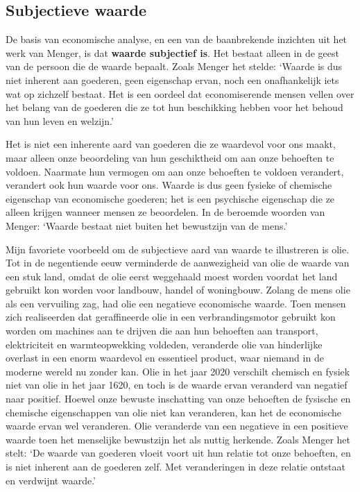 \subsection{Subjectieve waarde}

De basis van economische analyse, en een van de baanbrekende inzichten uit het werk van Menger, is dat \textbf{waarde subjectief is}. Het bestaat alleen in de geest van de persoon die de waarde bepaalt. Zoals Menger het stelde: `Waarde is dus niet inherent aan goederen, geen eigenschap ervan, noch een onafhankelijk iets wat op zichzelf bestaat. Het is een oordeel dat economiserende mensen vellen over het belang van de goederen die ze tot hun beschikking hebben voor het behoud van hun leven en welzijn.'\autocite{17}

Het is niet een inherente aard van goederen die ze waardevol voor ons maakt, maar alleen onze beoordeling van hun geschiktheid om aan onze behoeften te voldoen. Naarmate hun vermogen om aan onze behoeften te voldoen verandert, verandert ook hun waarde voor ons. Waarde is dus geen fysieke of chemische eigenschap van economische goederen; het is een psychische eigenschap die ze alleen krijgen wanneer mensen ze beoordelen. In de beroemde woorden van Menger: `Waarde bestaat niet buiten het bewustzijn van de mens.'\autocite{18}

Mijn favoriete voorbeeld om de subjectieve aard van waarde te illustreren is olie. Tot in de negentiende eeuw verminderde de aanwezigheid van olie de waarde van een stuk land, omdat de olie eerst weggehaald moest worden voordat het land gebruikt kon worden voor landbouw, handel of woningbouw. Zolang de mens olie als een vervuiling zag, had olie een negatieve economische waarde. Toen mensen zich realiseerden dat geraffineerde olie in een verbrandingsmotor gebruikt kon worden om machines aan te drijven die aan hun behoeften aan transport, elektriciteit en warmteopwekking voldeden, veranderde olie van hinderlijke overlast in een enorm waardevol en essentieel product, waar niemand in de moderne wereld nu zonder kan. Olie in het jaar 2020 verschilt chemisch en fysiek niet van olie in het jaar 1620, en toch is de waarde ervan veranderd van negatief naar positief. Hoewel onze bewuste inschatting van onze behoeften de fysische en chemische eigenschappen van olie niet kan veranderen, kan het de economische waarde ervan wel veranderen. Olie veranderde van een negatieve in een positieve waarde toen het menselijke bewustzijn het als nuttig herkende. Zoals Menger het stelt: `De waarde van goederen vloeit voort uit hun relatie tot onze behoeften, en is niet inherent aan de goederen zelf. Met veranderingen in deze relatie ontstaat en verdwijnt waarde.'\autocite{19}

